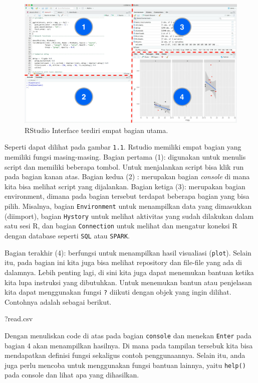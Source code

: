\documentclass[]{book}
\newenvironment{Shaded}{\begin{snugshade}}{\end{snugshade}}
\newcommand{\NormalTok}[1]{#1}
\theoremstyle{definition}
\theoremstyle{definition}
\theoremstyle{definition}
\theoremstyle{remark}
\begin{document}
\begin{figure}
\includegraphics[width=1\linewidth]{images/RStudio} \caption{RStudio Interface terdiri empat bagian utama.}\label{fig:RStudio}
\end{figure}

Seperti dapat dilihat pada gambar \texttt{1.1}. Rstudio memiliki empat
bagian yang memiliki fungsi masing-masing. Bagian pertama (1): digunakan
untuk menulis script dan memiliki beberapa tombol. Untuk menjalankan
script bisa klik run pada bagian kanan atas. Bagian kedua (2) :
merupakan bagian \emph{console} di mana kita bisa melihat script yang
dijalankan. Bagian ketiga (3): merupakan bagian environment, dimana pada
bagian tersebut terdapat beberapa bagian yang bisa pilih. Misalnya,
bagian \texttt{Environment} untuk menampilkan data yang dimasukkan
(diimport), bagian \texttt{Hystory} untuk melihat aktivitas yang sudah
dilakukan dalam satu sesi R, dan bagian \texttt{Connection} untuk
melihat dan mengatur koneksi R dengan database seperti \texttt{SQL} atau
\texttt{SPARK}.

Bagian terakhir (4): berfungsi untuk menampilkan hasil visualiasi
(\texttt{plot}). Selain itu, pada bagian ini kita juga bisa melihat
repository dan file-file yang ada di dalamnya. Lebih penting lagi, di
sini kita juga dapat menemukan bantuan ketika kita lupa instruksi yang
dibutuhkan. Untuk menemukan bantun atau penjelasan kita dapat
menggunakan fungsi \texttt{?} diikuti dengan objek yang ingin dilihat.
Contohnya adalah sebagai berikut.

\begin{Shaded}
\begin{Highlighting}[]
\NormalTok{?read.csv}
\end{Highlighting}
\end{Shaded}

Dengan menuliskan code di atas pada bagian \texttt{console} dan menekan
\texttt{Enter} pada bagian 4 akan menampilkan hasilnya. Di mana pada
tampilan tersebuk kita bisa mendapatkan definisi fungsi sekaligus contoh
penggunaannya. Selain itu, anda juga perlu mencoba untuk menggunakan
fungsi bantuan lainnya, yaitu \texttt{help()} pada console dan lihat apa
yang dihasilkan.
\end{document}
